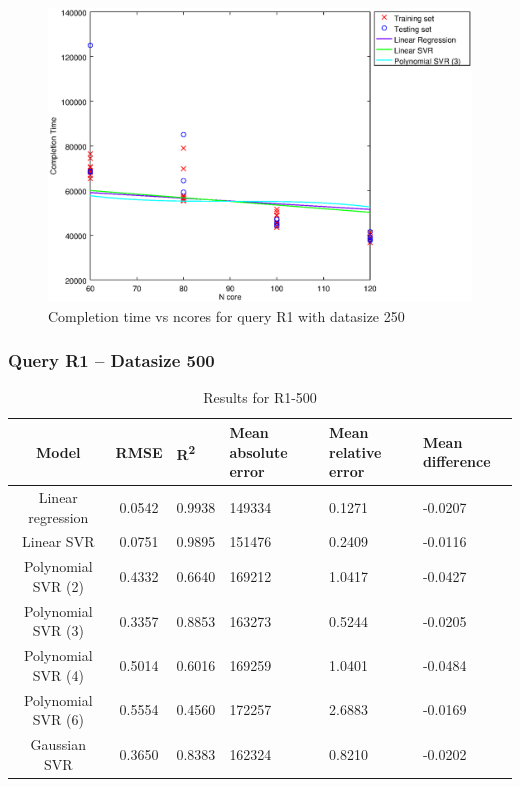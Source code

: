 \documentclass[a4paper,11pt]{article}
\begin{document}
\begin {figure}[hbtp]
\centering
\includegraphics[width=\textwidth]{output/R1_250_LINEAR_NCORE/plot_R1_250_bestmodels.eps}
\caption{Completion time vs ncores for query R1 with datasize 250}
\label{fig:all_linear_R1_250}
\end {figure}

\newpage
\subsubsection{Query R1 -- Datasize 500}
\begin{table}[H]
	\centering
	\begin{adjustbox}{center}
		\begin{tabular}{c | c M{1.2cm} M{2.5cm} M{2.5cm} M{1.8cm}}
			Model & RMSE & R\textsuperscript{2} & Mean absolute error & Mean relative error & Mean difference \tabularnewline
			\hline
			Linear regression & 0.0542 & 0.9938 & 149334 & 0.1271 & -0.0207 \\
			Linear SVR & 0.0751 & 0.9895 & 151476 & 0.2409 & -0.0116 \\
			Polynomial SVR (2) & 0.4332 & 0.6640 & 169212 & 1.0417 & -0.0427 \\
			Polynomial SVR (3) & 0.3357 & 0.8853 & 163273 & 0.5244 & -0.0205 \\
			Polynomial SVR (4) & 0.5014 & 0.6016 & 169259 & 1.0401 & -0.0484 \\
			Polynomial SVR (6) & 0.5554 & 0.4560 & 172257 & 2.6883 & -0.0169 \\
			Gaussian SVR & 0.3650 & 0.8383 & 162324 & 0.8210 & -0.0202 \\
		\end{tabular}
	\end{adjustbox}
	\\
	\caption{Results for R1-500}
	\label{fig:all_linear_R1_500}
\end{table}
\end{document}
